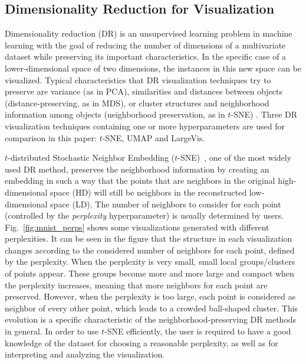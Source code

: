 \subsection{Dimensionality Reduction for Visualization}\label{subsec:background_DR}

Dimensionality reduction (DR) is an unsupervised learning problem in machine learning with the goal of reducing the number of dimensions of a multivariate dataset while preserving its important characteristics. In the specific case of a lower-dimensional space of two dimensions, the instances in this new space can be visualized. Typical characteristics that DR visualization techniques try to preserve are variance (as in PCA), similarities and distances between objects (distance-preserving, as in MDS), or cluster structures and neighborhood information among objects (neighborhood preservation, as in $t$-SNE) \cite{lee2007}. Three DR visualization techniques containing one or more hyperparameters are used for comparison in this paper: $t$-SNE, UMAP and LargeVis.

$t$-distributed Stochastic Neighbor Embedding ($t$-SNE)~\cite{maaten2008tsne}, one of the most widely used DR method, preserves the neighborhood information by creating an embedding in such a way that the points that are neighbors in the original high-dimensional space (HD) will still be neighbors in the reconstructed low-dimensional space (LD). 
The number of neighbors to consider for each point (controlled by the \emph{perplexity} hyperparameter) is usually determined by users.
Fig.~\ref{fig:mnist_perps} shows some visualizations generated with different perplexities. 
It can be seen in the figure that the structure in each visualization changes according to the considered number of neighbors for each point, defined by the perplexity. When the perplexity is very small, small local groups/clusters of points appear. These groups become more and more large and compact when the perplexity increases, meaning that more neighbors for each point are preserved. However, when the perplexity is too large, each point is considered as neighbor of every other point, which leads to a crowded ball-shaped cluster. This evolution is a specific characteristic of the neighborhood-preserving DR methods in general. In order to use $t$-SNE efficiently, the user is required to have a good knowledge of the dataset for choosing a reasonable perplexity, as well as for interpreting and analyzing the visualization.

